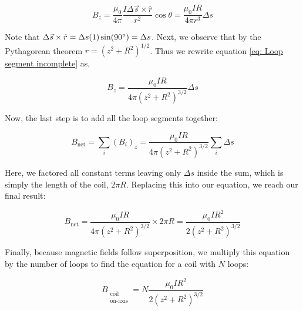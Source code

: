 \begin{equation}
    B_z=\frac{\mu_0}{4\pi}\frac{I\Delta\vec{s}\times\hat{r}}{r^2}\cos\theta=\frac{\mu_0IR}{4\pi r^3}\Delta{s}
    \label{eq: Loop segment incomplete}
\end{equation}

Note that $\Delta\vec{s}\times\hat{r}=\Delta s(1)\sin(90\degree)=\Delta s$. Next, we observe that by the Pythagorean theorem $r=(z^2+R^2)^{1/2}$. Thus we rewrite equation \eqref{eq: Loop segment incomplete} as,

\begin{equation}
    B_z=\frac{\mu_0IR}{4\pi(z^2+R^2)^{3/2}}\Delta s
    \label{eq: Loop segment comlpete}
\end{equation}

Now, the last step is to add all the loop segments together:

\begin{equation*}
    B_{\text{net}}=\sum_i(B_i)_z=\frac{\mu_0IR}{4\pi(z^2+R^2)^{3/2}}\sum_i\Delta s
\end{equation*}

Here, we factored all constant terms leaving only $\Delta s$ inside the sum, which is simply the length of the coil, $2\pi R$. Replacing this into our equation, we reach our final result:

\begin{equation}
    {B}_{\text{net}}=\frac{\mu_0IR}{4\pi(z^2+R^2)^{3/2}}\times2\pi R=\frac{\mu_0IR^2}{2(z^2+R^2)^{3/2}}
    \label{eq: Loop final equation}
\end{equation}

Finally, because magnetic fields follow superposition, we multiply this equation by the number of loops to find the equation for a coil with $N$ loops:

\begin{equation}
    {B}_{\substack{\text{coil} \\ \text{on-axis}}}=N\frac{\mu_0IR^2}{2(z^2+R^2)^{3/2}}
\end{equation}